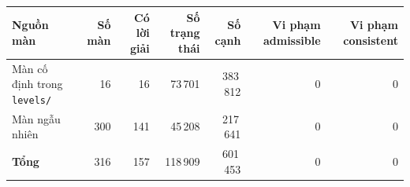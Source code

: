 \begin{tabular}{lrrrrrr}
\hline
Nguồn màn & Số màn & Có lời giải & Số trạng thái & Số cạnh & Vi phạm admissible & Vi phạm consistent \\
\hline
Màn cố định trong \texttt{levels/} & 16 & 16 & 73\,701 & 383\,812 & 0 & 0 \\
Màn ngẫu nhiên & 300 & 141 & 45\,208 & 217\,641 & 0 & 0 \\
\hline
\textbf{Tổng} & 316 & 157 & 118\,909 & 601\,453 & 0 & 0 \\
\hline
\end{tabular}

